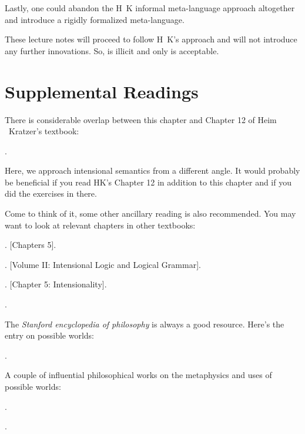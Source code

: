 Lastly, one could abandon the H\amp\ K informal meta-language approach
altogether and introduce a rigidly formalized meta-language.

These lecture notes will proceed to follow H\amp\ K's approach and will not
introduce any further innovations. So,  is illicit and only
 is acceptable.

\section{Supplemental Readings}

{\setlength{\parindent}{0pt}\nonzeroparskip

  There is considerable overlap between this chapter and Chapter 12 of
  Heim \amp\ Kratzer's textbook:
\begin{bibentrylist}
	\item {}. 
\end{bibentrylist}

Here, we approach intensional semantics from a different angle. It
would probably be beneficial if you read H\amp K's Chapter 12 in
addition to this chapter and if you did the exercises in there.

Come to think of it, some other ancillary reading is also recommended.
You may want to look at relevant chapters in other textbooks:
\begin{bibentrylist}
	\item {}. [Chapters 5]. 
	\item {}. [Volume II: Intensional Logic and Logical Grammar]. 
	\item
          .
          [Chapter 5: Intensionality]. 
        \item {}.
\end{bibentrylist}

The \emph{Stanford encyclopedia of philosophy} is always a good resource. Here's
the entry on possible worlds:
\begin{bibentrylist}
	\item {}. 
\end{bibentrylist}

A couple of influential philosophical works on the metaphysics and
uses of possible worlds:
\begin{bibentrylist}
	\item {}. 
	\item {}. 
\end{bibentrylist}

}
